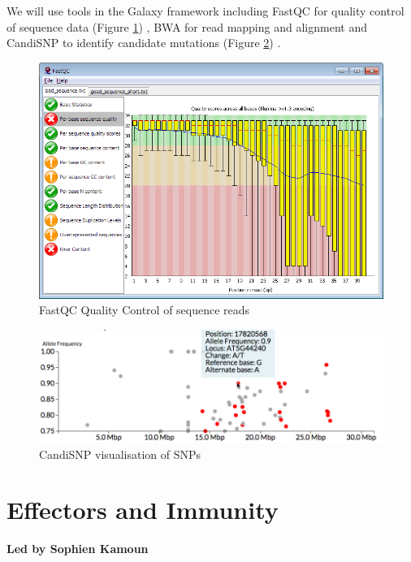 \documentclass[12pt,]{book}
\begin{document}
We will use tools in the Galaxy \citep{Goecks:2010ea} framework
including FastQC for quality control of sequence data (Figure
\ref{fig:fqc}) \citep{FastQC}, BWA for read mapping and alignment
\citep{Li:2009fi} and CandiSNP \citep{Etherington:2014ba} to identify
candidate mutations (Figure \ref{fig:candisnp}) .

\begin{figure}
\includegraphics[width=5.08in]{assets/fastqc} \caption{FastQC Quality Control of sequence reads}\label{fig:fqc}
\end{figure}

\begin{figure}
\includegraphics[width=5.77in]{assets/candisnp} \caption{CandiSNP visualisation of SNPs}\label{fig:candisnp}
\end{figure}

\chapter*{Effectors and Immunity}\label{effectors-and-immunity}

\textbf{Led by Sophien Kamoun}
\end{document}
